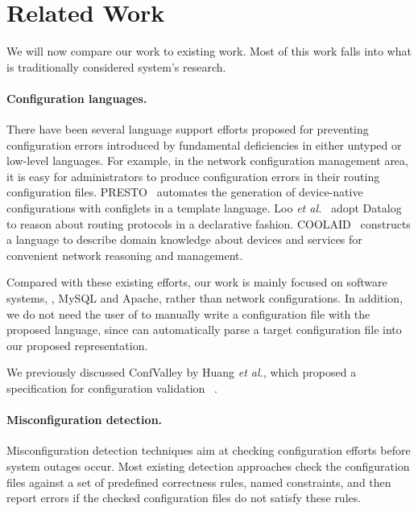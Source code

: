 
\section{Related Work}

We will now compare our work to existing work. Most of this 
work falls into what is traditionally considered system's research.

\paragraph{Configuration languages.}
There have been several language support efforts proposed for preventing
configuration errors introduced by fundamental deficiencies in
either untyped or low-level languages. For example, in the network
configuration management area, it is easy for administrators to
produce configuration errors in their routing configuration files.
PRESTO~\cite{enck07configuration} 
automates the generation of device-native configurations
with configlets in a template language. 
Loo {\em et al.}~\cite{loo05declarative} adopt Datalog to reason about 
routing protocols in a declarative fashion. 
COOLAID~\cite{chen10declarative} constructs
a language to describe domain knowledge about devices and
services for convenient network reasoning and management.

Compared with these existing efforts, 
our work is mainly focused on software systems, \eg, MySQL and Apache,
rather than network configurations. In addition, we do not need 
the user of \app to manually write a configuration file with the proposed
language, since \app can automatically parse a target configuration
file into our proposed representation.

We previously discussed ConfValley by Huang {\em et al.}, which proposed a specification for configuration validation%
~\cite{huang15confvalley}.

\paragraph{Misconfiguration detection.}
Misconfiguration detection techniques aim at checking configuration
efforts before system outages occur.
Most existing detection approaches check 
the configuration files against a set of predefined correctness 
rules, named constraints, and then report errors if 
the checked configuration files do not satisfy these rules.

